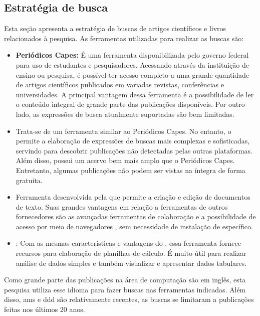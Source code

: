 \subsection{Estratégia de busca}
Esta seção apresenta a estratégia de buscas de artigos científicos e livros relacionados à pesquisa. As ferramentas utilizadas para realizar as buscas são:
\begin{itemize}
    \item \textbf{Periódicos Capes:} É uma ferramenta disponibilizada pelo governo federal para uso de estudantes e pesquisadores. Acessando através da instituição de ensino ou pesquisa, é possível ter acesso completo a uma grande quantidade de artigos científicos publicados em variadas revistas, conferências e universidades. A principal vantagem dessa ferramenta é a possibilidade de ler o conteúdo integral de grande parte das publicações disponíveis. Por outro lado, as expressões de busca atualmente suportadas são bem limitadas.
    \item \textbf{} Trata-se de um ferramenta similar ao Periódicos Capes. No entanto, o  permite a elaboração de expressões de buscas mais complexas e sofisticadas, servindo para descobrir publicações não detectadas pelas outras plataformas. Além disso, possui um acervo bem mais amplo que o Periódicos Capes. Entretanto, algumas publicações não podem ser vistas na íntegra de forma gratuita.
    \item \textbf{} Ferramenta desenvolvida pela  que permite a criação e edição de documentos de texto. Suas grandes vantagens em relação a ferramentas de outros fornecedores são as avançadas ferramentas de colaboração e a possibilidade de acesso por meio de navegadores , sem necessidade de instalação de  específico.
    \item \textbf{}: Com as mesmas características e vantagens do , essa ferramenta fornece recursos para elaboração de planilhas de cálculo. É muito útil para realizar análise de dados simples e também visualizar e apresentar dados tabulares.
\end{itemize}

Como grande parte das publicações na área de computação são em inglês, esta pesquisa utiliza esse idioma para fazer buscas nas ferramentas indicadas. Além disso, \acrfull{ams} e \acrfull{ddd} são relativamente recentes, as buscas se limitaram a publicações feitas nos últimos 20 anos.


